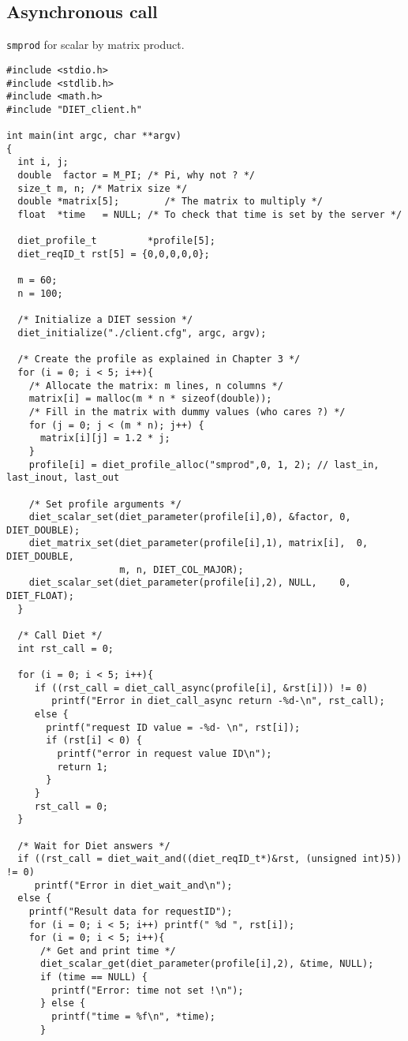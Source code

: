 \subsection{Asynchronous call}
\texttt{smprod}
for scalar by matrix product.
{\footnotesize
\begin{verbatim}
#include <stdio.h>
#include <stdlib.h>
#include <math.h>
#include "DIET_client.h"

int main(int argc, char **argv)
{
  int i, j;
  double  factor = M_PI; /* Pi, why not ? */
  size_t m, n; /* Matrix size */
  double *matrix[5];        /* The matrix to multiply */
  float  *time   = NULL; /* To check that time is set by the server */

  diet_profile_t         *profile[5];
  diet_reqID_t rst[5] = {0,0,0,0,0};

  m = 60;
  n = 100;
 
  /* Initialize a DIET session */
  diet_initialize("./client.cfg", argc, argv);

  /* Create the profile as explained in Chapter 3 */
  for (i = 0; i < 5; i++){
    /* Allocate the matrix: m lines, n columns */
    matrix[i] = malloc(m * n * sizeof(double));
    /* Fill in the matrix with dummy values (who cares ?) */
    for (j = 0; j < (m * n); j++) {
      matrix[i][j] = 1.2 * j;
    }
    profile[i] = diet_profile_alloc("smprod",0, 1, 2); // last_in, last_inout, last_out
  
    /* Set profile arguments */
    diet_scalar_set(diet_parameter(profile[i],0), &factor, 0, DIET_DOUBLE);
    diet_matrix_set(diet_parameter(profile[i],1), matrix[i],  0, DIET_DOUBLE,
                    m, n, DIET_COL_MAJOR);
    diet_scalar_set(diet_parameter(profile[i],2), NULL,    0, DIET_FLOAT);
  }
  
  /* Call Diet */
  int rst_call = 0;
  
  for (i = 0; i < 5; i++){
     if ((rst_call = diet_call_async(profile[i], &rst[i])) != 0)  
        printf("Error in diet_call_async return -%d-\n", rst_call);
     else {
       printf("request ID value = -%d- \n", rst[i]);
       if (rst[i] < 0) {
         printf("error in request value ID\n");
         return 1;
       }
     }
     rst_call = 0;
  }   

  /* Wait for Diet answers */
  if ((rst_call = diet_wait_and((diet_reqID_t*)&rst, (unsigned int)5)) != 0)
     printf("Error in diet_wait_and\n");
  else {
    printf("Result data for requestID");
    for (i = 0; i < 5; i++) printf(" %d ", rst[i]);
    for (i = 0; i < 5; i++){
      /* Get and print time */
      diet_scalar_get(diet_parameter(profile[i],2), &time, NULL);
      if (time == NULL) {
        printf("Error: time not set !\n");
      } else {
        printf("time = %f\n", *time);
      }


\end{verbatim}}
